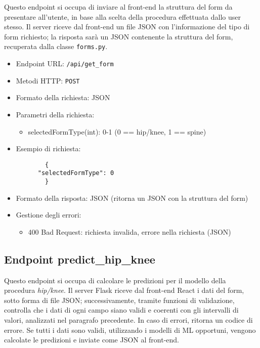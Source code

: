 Questo endpoint si occupa di inviare al front-end la struttura del form da presentare all'utente, in base alla scelta della procedura effettuata dallo user stesso.
\newline
Il server riceve dal front-end un file JSON con l’informazione del tipo di form richiesto; la risposta sarà un JSON contenente la struttura del form, recuperata dalla classe \verb|forms.py|.

\begin{itemize}
  \item Endpoint URL: \verb|/api/get_form|
  \item Metodi HTTP: \verb|POST|
  \item Formato della richiesta: JSON
  \item Parametri della richiesta:
    \begin{itemize}
        \item selectedFormType(int): 0-1 (0 == hip/knee, 1 == spine)
    \end{itemize}
  \item Esempio di richiesta:
    \begin{verbatim}
        {
      "selectedFormType": 0
        }
    \end{verbatim}
  \item Formato della risposta: JSON (ritorna un JSON con la struttura del form)
  \item Gestione degli errori:
      \begin{itemize}
        \item 400 Bad Request: richiesta invalida, errore nella richiesta (JSON)
    \end{itemize}
\end{itemize}


\subsection{Endpoint predict\_hip\_knee}
\label{subsec:predict_hip_knee}

Questo endpoint si occupa di calcolare le predizioni per il modello della procedura \textit{hip/knee}.
\newline
Il server Flask riceve dal front-end React i dati del form, sotto forma di file JSON; successivamente, tramite funzioni di validazione, controlla che i dati di ogni campo siano validi e coerenti con gli intervalli di valori, analizzati nel paragrafo precedente. 
\newline
In caso di errori, ritorna un codice di errore. Se tutti i dati sono validi, utilizzando i modelli di ML opportuni, vengono calcolate le predizioni e inviate come JSON al front-end.

